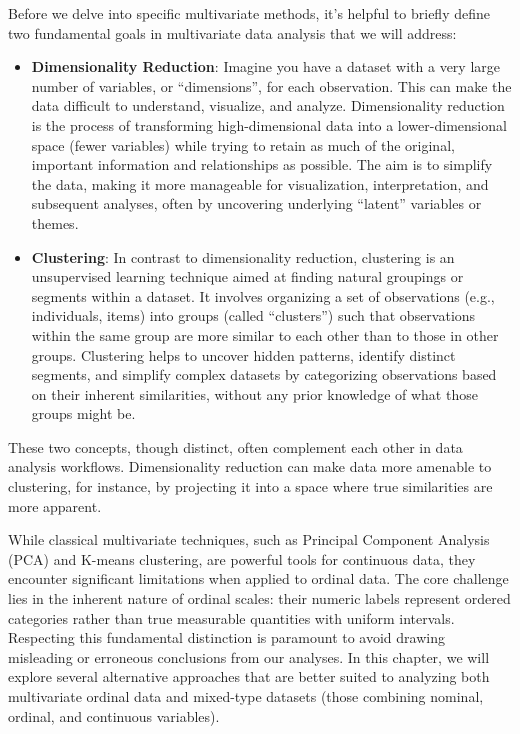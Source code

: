 \documentclass[
  letterpaper,
  DIV=11,
  numbers=noendperiod]{scrartcl}
\begin{document}
Before we delve into specific multivariate methods, it's helpful to
briefly define two fundamental goals in multivariate data analysis that
we will address:

\begin{itemize}
\item
  \textbf{Dimensionality Reduction}: Imagine you have a dataset with a
  very large number of variables, or ``dimensions'', for each
  observation. This can make the data difficult to understand,
  visualize, and analyze. Dimensionality reduction is the process of
  transforming high-dimensional data into a lower-dimensional space
  (fewer variables) while trying to retain as much of the original,
  important information and relationships as possible. The aim is to
  simplify the data, making it more manageable for visualization,
  interpretation, and subsequent analyses, often by uncovering
  underlying ``latent'' variables or themes.
\item
  \textbf{Clustering}: In contrast to dimensionality reduction,
  clustering is an unsupervised learning technique aimed at finding
  natural groupings or segments within a dataset. It involves organizing
  a set of observations (e.g., individuals, items) into groups (called
  ``clusters'') such that observations within the same group are more
  similar to each other than to those in other groups. Clustering helps
  to uncover hidden patterns, identify distinct segments, and simplify
  complex datasets by categorizing observations based on their inherent
  similarities, without any prior knowledge of what those groups might
  be.
\end{itemize}

These two concepts, though distinct, often complement each other in data
analysis workflows. Dimensionality reduction can make data more amenable
to clustering, for instance, by projecting it into a space where true
similarities are more apparent.

While classical multivariate techniques, such as Principal Component
Analysis (PCA) and K-means clustering, are powerful tools for continuous
data, they encounter significant limitations when applied to ordinal
data. The core challenge lies in the inherent nature of ordinal scales:
their numeric labels represent ordered categories rather than true
measurable quantities with uniform intervals. Respecting this
fundamental distinction is paramount to avoid drawing misleading or
erroneous conclusions from our analyses. In this chapter, we will
explore several alternative approaches that are better suited to
analyzing both multivariate ordinal data and mixed-type datasets (those
combining nominal, ordinal, and continuous variables).
\end{document}
